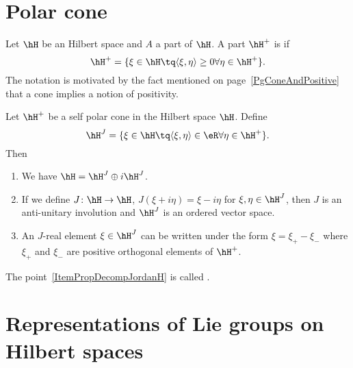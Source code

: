 \section{Polar cone}

Let $\hH$ be an Hilbert space and $A$ a part of $\hH$. A part $\hH^+$ is  if
\begin{equation}
	\hH^+=\{ \xi\in\hH\tq\langle \xi, \eta\rangle \geq 0\forall \eta\in \hH^+ \}.
\end{equation}
The notation is motivated by the fact mentioned on page~\ref{PgConeAndPositive} that a cone implies a notion of positivity.

\begin{proposition}
	Let $\hH^+$ be a self polar cone in the Hilbert space $\hH$. Define
	\begin{equation}
		\hH^J=\{ \xi\in\hH\tq\langle \xi, \eta\rangle \in\eR\forall\eta\in\hH^+ \}.
	\end{equation}
	Then
	\begin{enumerate}
		\item
			We have $\hH=\hH^J\oplus i\hH^J$.
		\item
			If we define $J\colon \hH\to \hH$, $J(\xi+i\eta)=\xi-i\eta$ for $\xi,\eta\in\hH^J$, then $J$ is an anti-unitary involution and $\hH^J$ is an ordered vector space.
		\item\label{ItemPropDecompJordanH}
			An $J$-real element $\xi\in\hH^J$ can be written under the form $\xi=\xi_+-\xi_-$ where $\xi_+$ and $\xi_-$ are positive orthogonal elements of $\hH^+$.
	\end{enumerate}
\end{proposition}
The point~\ref{ItemPropDecompJordanH} is called .


\section{Representations of Lie groups on Hilbert spaces}

